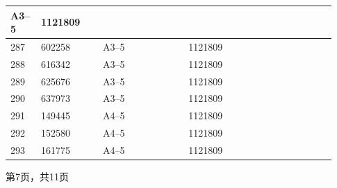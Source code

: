 \documentclass[UTF8,10pt,a4paper,fontset=fandol]{ctexart}
\newcommand{\fieldvalue}[1]{#1}
\begin{document}
\begin{center}
\begin{tabular}{|p{0.07\linewidth}|p{0.18\linewidth}|p{0.25\linewidth}|p{0.25\linewidth}|p{0.18\linewidth}|}
\fieldvalue{A3--5} &
\fieldvalue{1121809} & \\ \hline
\fieldvalue{287} &
\fieldvalue{602258} &
\fieldvalue{A3--5} &
\fieldvalue{1121809} & \\ \hline
\fieldvalue{288} &
\fieldvalue{616342} &
\fieldvalue{A3--5} &
\fieldvalue{1121809} & \\ \hline
\fieldvalue{289} &
\fieldvalue{625676} &
\fieldvalue{A3--5} &
\fieldvalue{1121809} & \\ \hline
\fieldvalue{290} &
\fieldvalue{637973} &
\fieldvalue{A3--5} &
\fieldvalue{1121809} & \\ \hline
\fieldvalue{291} &
\fieldvalue{149445} &
\fieldvalue{A4--5} &
\fieldvalue{1121809} & \\ \hline
\fieldvalue{292} &
\fieldvalue{152580} &
\fieldvalue{A4--5} &
\fieldvalue{1121809} & \\ \hline
\fieldvalue{293} &
\fieldvalue{161775} &
\fieldvalue{A4--5} &
\fieldvalue{1121809} & \\ \hline
\end{tabular}

\vspace{3mm}

第7页，共11页
\end{center}
\end{document}
